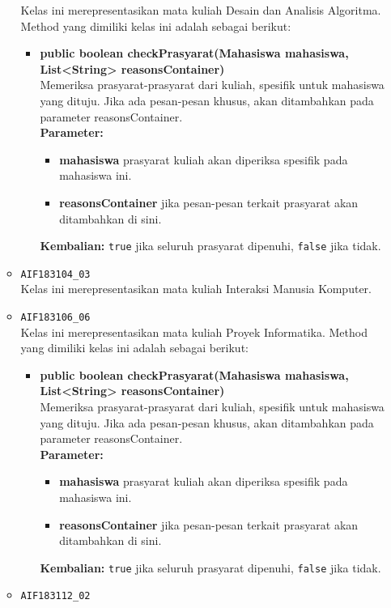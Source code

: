 \begin{enumerate}
\begin{itemize}
		Kelas ini merepresentasikan mata kuliah Desain dan Analisis Algoritma. Method yang dimiliki kelas ini adalah sebagai berikut: 
		\begin{itemize}
			\item \textbf{public boolean checkPrasyarat(Mahasiswa mahasiswa, List<String> reasonsContainer)}\\
			Memeriksa prasyarat-prasyarat dari kuliah, spesifik untuk mahasiswa yang dituju. Jika ada pesan-pesan khusus, akan ditambahkan pada parameter reasonsContainer.\\
			\textbf{Parameter:}
			\begin{itemize}
				\item \textbf{mahasiswa} prasyarat kuliah akan diperiksa spesifik pada mahasiswa ini.
				\item \textbf{reasonsContainer} jika pesan-pesan terkait prasyarat akan ditambahkan di sini.
			\end{itemize}
			\textbf{Kembalian:} \texttt{true} jika seluruh prasyarat dipenuhi, \texttt{false} jika tidak.
		\end{itemize}
		\item \texttt{AIF183104\_03} \\
		Kelas ini merepresentasikan mata kuliah Interaksi Manusia Komputer.
		\item \texttt{AIF183106\_06} \\
		Kelas ini merepresentasikan mata kuliah Proyek Informatika. Method yang dimiliki kelas ini adalah sebagai berikut: 
		\begin{itemize}
			\item \textbf{public boolean checkPrasyarat(Mahasiswa mahasiswa, List<String> reasonsContainer)}\\
			Memeriksa prasyarat-prasyarat dari kuliah, spesifik untuk mahasiswa yang dituju. Jika ada pesan-pesan khusus, akan ditambahkan pada parameter reasonsContainer.\\
			\textbf{Parameter:}
			\begin{itemize}
				\item \textbf{mahasiswa} prasyarat kuliah akan diperiksa spesifik pada mahasiswa ini.
				\item \textbf{reasonsContainer} jika pesan-pesan terkait prasyarat akan ditambahkan di sini.
			\end{itemize}
			\textbf{Kembalian:} \texttt{true} jika seluruh prasyarat dipenuhi, \texttt{false} jika tidak.
		\end{itemize}
		\item \texttt{AIF183112\_02} \\

\end{itemize}
\end{enumerate}
